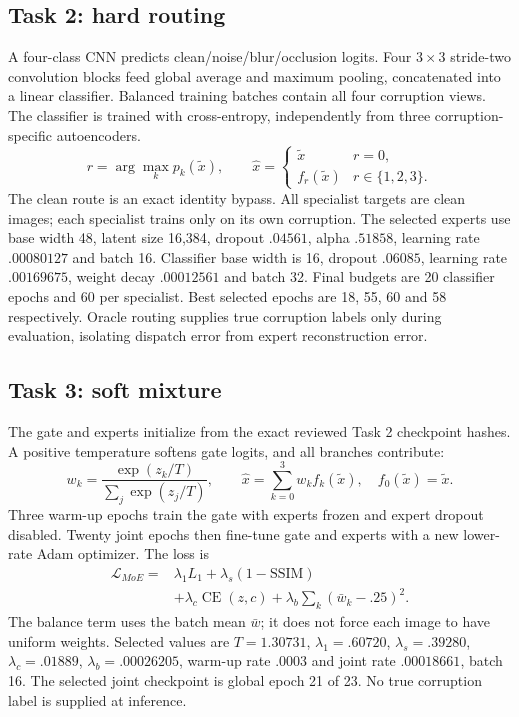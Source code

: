 \documentclass[conference]{IEEEtran}
\begin{document}
\subsection{Task 2: hard routing}
A four-class CNN predicts clean/noise/blur/occlusion logits. Four $3\times3$ stride-two convolution blocks feed global average and maximum pooling, concatenated into a linear classifier. Balanced training batches contain all four corruption views. The classifier is trained with cross-entropy, independently from three corruption-specific autoencoders.
\begin{equation}
r=\arg\max_k p_k(\tilde{x}),\qquad
\hat{x}=\begin{cases}\tilde{x}&r=0,\\f_r(\tilde{x})&r\in\{1,2,3\}.\end{cases}
\end{equation}
The clean route is an exact identity bypass. All specialist targets are clean images; each specialist trains only on its own corruption. The selected experts use base width 48, latent size 16,384, dropout $.04561$, alpha $.51858$, learning rate $.00080127$ and batch 16. Classifier base width is 16, dropout $.06085$, learning rate $.00169675$, weight decay $.00012561$ and batch 32. Final budgets are 20 classifier epochs and 60 per specialist. Best selected epochs are 18, 55, 60 and 58 respectively. Oracle routing supplies true corruption labels only during evaluation, isolating dispatch error from expert reconstruction error.

\subsection{Task 3: soft mixture}
The gate and experts initialize from the exact reviewed Task 2 checkpoint hashes. A positive temperature softens gate logits, and all branches contribute:
\begin{equation}w_k=\frac{\exp(z_k/T)}{\sum_j\exp(z_j/T)},\qquad \hat{x}=\sum_{k=0}^3w_k f_k(\tilde{x}),\quad f_0(\tilde{x})=\tilde{x}.\end{equation}
Three warm-up epochs train the gate with experts frozen and expert dropout disabled. Twenty joint epochs then fine-tune gate and experts with a new lower-rate Adam optimizer. The loss is
\begin{align}
\mathcal{L}_{MoE}={}&\lambda_1L_1+\lambda_s(1-\mathrm{SSIM})\nonumber\\
&+\lambda_c\operatorname{CE}(z,c)+\lambda_b\sum_k(\bar{w}_k-.25)^2 .
\end{align}
The balance term uses the batch mean $\bar{w}$; it does not force each image to have uniform weights. Selected values are $T=1.30731$, $\lambda_1=.60720$, $\lambda_s=.39280$, $\lambda_c=.01889$, $\lambda_b=.00026205$, warm-up rate $.0003$ and joint rate $.00018661$, batch 16. The selected joint checkpoint is global epoch 21 of 23. No true corruption label is supplied at inference.
\end{document}
